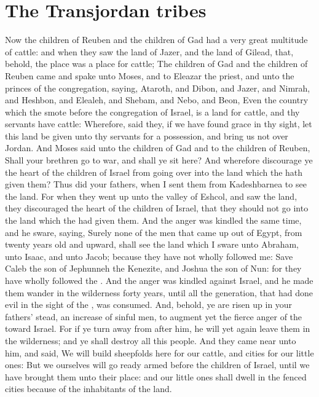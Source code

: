 \section*{The Transjordan tribes}
\begin{biblechapter} %
\verse Now the children of Reuben and the children of Gad had a very great multitude of cattle: and when they saw the land of Jazer, and the land of Gilead, that, behold, the place was a place for cattle;
\verse The children of Gad and the children of Reuben came and spake unto Moses, and to Eleazar the priest, and unto the princes of the congregation, saying,
\verse Ataroth, and Dibon, and Jazer, and Nimrah, and Heshbon, and Elealeh, and Shebam, and Nebo, and Beon,
\verse Even the country which the \LORD smote before the congregation of Israel, is a land for cattle, and thy servants have cattle:
\verse Wherefore, said they, if we have found grace in thy sight, let this land be given unto thy servants for a possession, and bring us not over Jordan.
\verse And Moses said unto the children of Gad and to the children of Reuben, Shall your brethren go to war, and shall ye sit here?
\verse And wherefore discourage ye the heart of the children of Israel from going over into the land which the \LORD hath given them?
\verse Thus did your fathers, when I sent them from Kadeshbarnea to see the land.
\verse For when they went up unto the valley of Eshcol, and saw the land, they discouraged the heart of the children of Israel, that they should not go into the land which the \LORD had given them.
\verse And the \LORDs anger was kindled the same time, and he sware, saying,
\verse Surely none of the men that came up out of Egypt, from twenty years old and upward, shall see the land which I sware unto Abraham, unto Isaac, and unto Jacob; because they have not wholly followed me:
\verse Save Caleb the son of Jephunneh the Kenezite, and Joshua the son of Nun: for they have wholly followed the \LORD.
\verse And the \LORDs anger was kindled against Israel, and he made them wander in the wilderness forty years, until all the generation, that had done evil in the sight of the \LORD, was consumed.
\verse And, behold, ye are risen up in your fathers' stead, an increase of sinful men, to augment yet the fierce anger of the \LORD toward Israel.
\verse For if ye turn away from after him, he will yet again leave them in the wilderness; and ye shall destroy all this people.
\verse And they came near unto him, and said, We will build sheepfolds here for our cattle, and cities for our little ones:
\verse But we ourselves will go ready armed before the children of Israel, until we have brought them unto their place: and our little ones shall dwell in the fenced cities because of the inhabitants of the land.

\end{biblechapter}
